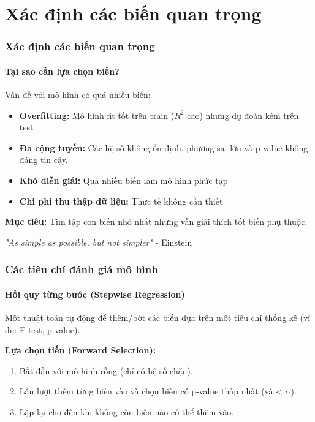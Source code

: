 \section{Xác định các biến quan trọng}

\begin{frame}
    \frametitle{Xác định các biến quan trọng}
    \framesubtitle{Tại sao cần lựa chọn biến?}
    Vấn đề với mô hình có quá nhiều biến:
    \begin{itemize}
        \item \textbf{Overfitting:} Mô hình fit tốt trên train ($R^2$ cao) nhưng dự đoán kém trên test
        \item \textbf{Đa cộng tuyến:} Các hệ số không ổn định, phương sai lớn và p-value không đáng tin cậy.
        \item \textbf{Khó diễn giải:} Quá nhiều biến làm mô hình phức tạp
        \item \textbf{Chi phí thu thập dữ liệu:} Thực tế không cần thiết
    \end{itemize}
    \textbf{Mục tiêu:} Tìm tập con biến nhỏ nhất nhưng vẫn giải thích tốt biến phụ thuộc.
        
    \textit{"As simple as possible, but not simpler"} - Einstein
\end{frame}

\begin{frame}
    \frametitle{Các tiêu chí đánh giá mô hình}
    \framesubtitle{Hồi quy từng bước (Stepwise Regression)}
    Một thuật toán tự động để thêm/bớt các biến dựa trên một tiêu chí thống kê (ví dụ: F-test, p-value).
    
    \textbf{Lựa chọn tiến (Forward Selection):}
    \begin{enumerate}
        \item Bắt đầu với mô hình rỗng (chỉ có hệ số chặn).
        \item Lần lượt thêm từng biến vào và chọn biến có p-value thấp nhất (và < $\alpha$).
        \item Lặp lại cho đến khi không còn biến nào có thể thêm vào.
    \end{enumerate}
\end{frame}

